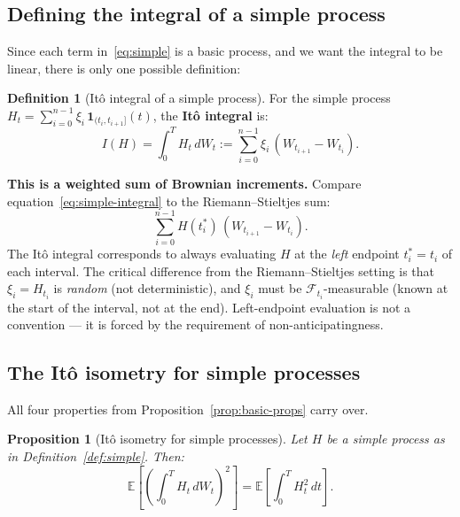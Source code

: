 \documentclass[11pt,a4paper]{article}
\theoremstyle{definition}
\newtheorem{definition}{Definition}[section]
\theoremstyle{plain}
\newtheorem{proposition}{Proposition}[section]
\theoremstyle{remark}
\newcommand{\E}{\mathbb{E}}
\newcommand{\F}{\mathcal{F}}
\begin{document}
\subsection{Defining the integral of a simple process}

Since each term in~\eqref{eq:simple} is a basic process, and we want the integral to be linear, there is only one possible definition:

\begin{definition}[Itô integral of a simple process]
\label{def:simple-integral}
For the simple process $H_t = \sum_{i=0}^{n-1} \xi_i\,\mathbf{1}_{(t_i,t_{i+1}]}(t)$, the \textbf{Itô integral} is:
\begin{equation}
  \label{eq:simple-integral}
  I(H) = \int_0^T H_t\,dW_t := \sum_{i=0}^{n-1} \xi_i\,(W_{t_{i+1}} - W_{t_i}).
\end{equation}
\end{definition}

\begin{keyidea}
\textbf{This is a weighted sum of Brownian increments.}
Compare equation~\eqref{eq:simple-integral} to the Riemann--Stieltjes sum:
\[
  \sum_{i=0}^{n-1} H(t_i^*)\,(W_{t_{i+1}} - W_{t_i}).
\]
The Itô integral corresponds to always evaluating $H$ at the \emph{left} endpoint $t_i^*= t_i$ of each interval. The critical difference from the Riemann--Stieltjes setting is that $\xi_i = H_{t_i}$ is \emph{random} (not deterministic), and $\xi_i$ must be $\F_{t_i}$-measurable (known at the start of the interval, not at the end). Left-endpoint evaluation is not a convention — it is forced by the requirement of non-anticipatingness.
\end{keyidea}

\subsection{The Itô isometry for simple processes}

All four properties from Proposition~\ref{prop:basic-props} carry over.

\begin{proposition}[Itô isometry for simple processes]
\label{prop:iso-simple}
Let $H$ be a simple process as in Definition~\ref{def:simple}. Then:
\begin{equation}
  \label{eq:isometry}
  \E\left[\left(\int_0^T H_t\,dW_t\right)^2\right] = \E\left[\int_0^T H_t^2\,dt\right].
\end{equation}
\end{proposition}
\end{document}
